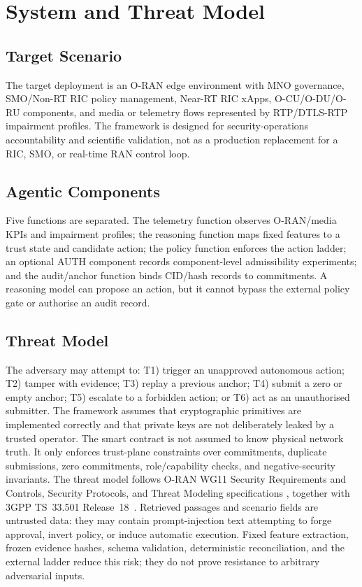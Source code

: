 \documentclass[journal]{IEEEtran}
\begin{document}
\section{System and Threat Model}
\label{sec:system}
\subsection{Target Scenario}
The target deployment is an O-RAN edge environment with MNO governance,
SMO/Non-RT RIC policy management, Near-RT RIC xApps, O-CU/O-DU/O-RU
components, and media or telemetry flows represented by RTP/DTLS-RTP
impairment profiles. The framework is designed for security-operations
accountability and scientific validation, not as a production replacement for
a RIC, SMO, or real-time RAN control loop.
\subsection{Agentic Components}
Five functions are separated. The telemetry function observes O-RAN/media
KPIs and impairment profiles; the reasoning function maps fixed features to a
trust state and candidate action; the policy function enforces the action
ladder; an optional AUTH component records component-level admissibility
experiments; and the audit/anchor function binds CID/hash records to
commitments. A reasoning model can propose an action, but it cannot bypass the
external policy gate or authorise an audit record.
\subsection{Threat Model}
The adversary may attempt to: T1) trigger an unapproved autonomous action;
T2) tamper with evidence; T3) replay a previous anchor; T4) submit a zero or
empty anchor; T5) escalate to a forbidden action; or T6) act as an
unauthorised submitter. The framework assumes that cryptographic primitives
are implemented correctly and that private keys are not deliberately leaked by
a trusted operator. The smart contract is not assumed to know physical network
truth. It only enforces trust-plane constraints over commitments, duplicate
submissions, zero commitments, role/capability checks, and negative-security
invariants.
The threat model follows O-RAN WG11 Security Requirements and Controls,
Security Protocols, and Threat Modeling specifications
\cite{oranSecReq,oranSecProtocols,oranThreatModel}, together with 3GPP
TS~33.501 Release~18~\cite{threegpp33501}. Retrieved passages and scenario
fields are untrusted data: they may contain prompt-injection text attempting
to forge approval, invert policy, or induce automatic execution. Fixed feature
extraction, frozen evidence hashes, schema validation, deterministic
reconciliation, and the external ladder reduce this risk; they do not prove
resistance to arbitrary adversarial inputs.
\end{document}

